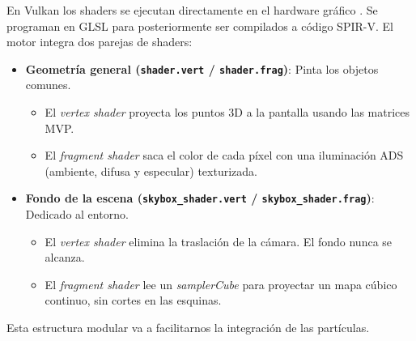 En Vulkan los shaders se ejecutan directamente en el hardware gráfico \parencite{vulkan_spec_shaders}. Se programan en GLSL para posteriormente ser compilados a código SPIR-V.                                
El motor integra dos parejas de shaders:

\begin{itemize}
\item \textbf{Geometría general (\texttt{shader.vert} / \texttt{shader.frag})}: Pinta los objetos comunes.
\begin{itemize}
    \item El \textit{vertex shader} proyecta los puntos 3D a la pantalla usando las matrices MVP.
    \item El \textit{fragment shader} saca el color de cada píxel con una iluminación ADS (ambiente, difusa y especular) texturizada.
\end{itemize}

\item \textbf{Fondo de la escena (\texttt{skybox\_shader.vert} / \texttt{skybox\_shader.frag})}: Dedicado al entorno.
\begin{itemize}
    \item El \textit{vertex shader} elimina la traslación de la cámara. El fondo nunca se alcanza.
    \item El \textit{fragment shader} lee un \textit{samplerCube} para proyectar un mapa cúbico continuo, sin cortes en las esquinas.
\end{itemize}
\end{itemize}

\noindent Esta estructura modular va a facilitarnos la integración de las partículas. 